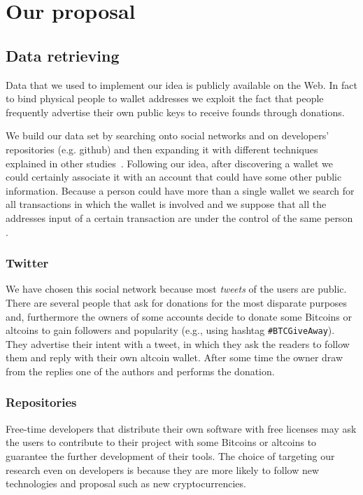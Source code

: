 \section{Our proposal}

\subsection{Data retrieving}
Data that we used to implement our idea is publicly available on the Web. In
fact to bind physical people to wallet addresses we exploit the fact that
people frequently advertise their own public keys to receive founds
through donations.

We build our data set by searching onto social networks and on developers'
repositories (e.g. github) and then expanding it with different techniques
explained in other studies~\cite{bib:fistful}. Following our idea, after
discovering a wallet we could certainly associate it with an account that could
have some other public information. Because a person could have more than a
single wallet we search for all transactions in which the wallet is involved
and we suppose that all the addresses input of a certain transaction are under
the control of the same person \cite{bib:satoshi} \cite{bib:deanon}
\cite{bib:fistful}.

\subsubsection*{Twitter}
We have chosen this social network because most \textit{tweets} of the users are
public. There are several people that ask for donations for the most disparate
purposes and, furthermore the owners of some accounts decide to donate some
Bitcoins or altcoins to gain followers and popularity (e.g., using hashtag
\texttt{\#BTCGiveAway}). They advertise their intent with a tweet, in which
they ask the readers to follow them and reply with their own altcoin wallet.
After some time the owner draw from the replies one of the authors and performs
the donation.

\subsubsection*{Repositories}
Free-time developers that distribute their own software with free licenses may
ask the users to contribute to their project with some Bitcoins or altcoins to
guarantee the further development of their tools. The choice of targeting our
research even on developers is because they are more likely to follow new
technologies and proposal such as new cryptocurrencies. 

